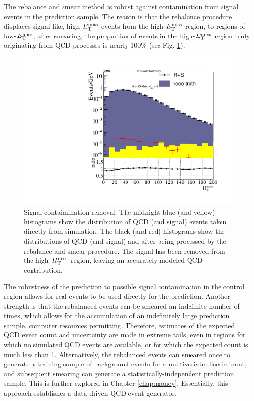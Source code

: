 The rebalance and smear method is robust against contamination from signal events in the prediction sample. The reason is that the rebalance procedure displaces signal-like, high-$E_{\text{T}}^{\rm miss}$ events from the high-$E_{\text{T}}^{\rm miss}$ region, to regions of low-$E_{\text{T}}^{\rm miss}$; after smearing, the proportion of events in the high-$E_{\text{T}}^{\rm miss}$ region truly originating from QCD processes is nearly 100\% (see Fig. \ref{fig:RplusSContamination}). 
\begin{figure}[h]
\centering
\includegraphics[width=0.6\linewidth]{figures/SusySearches/Ra2b2016/RplusSContam.pdf}
\caption{Signal contaimination removal. The midnight blue (and yellow) histograms show the distribution of QCD (and signal) events taken directly from simulation. The black (and red) histograms show the distributions of QCD (and signal) and after being processed by the rebalance and smear procedure. The signal has been removed from the high-$H_{\text{T}}^{\rm miss}$ region, leaving an accurately modeled QCD contribution.}
\label{fig:RplusSContamination}
\end{figure}
The robustness of the prediction to possible signal contamination in the control region allows for real events to be used directly for the prediction. Another strength is that the rebalanced events can be smeared an indefinite number of times, which allows for the accumulation of an indefinitely large prediction sample, computer resources permitting. Therefore, estimates of the expected QCD event count and uncertainty are made in extreme tails, even in regions for which no simulated QCD events are available, or for which the expected count is much less than 1. Alternatively, the rebalanced events can smeared once to generate a training sample of background events for a multivariate discriminant, and subsequent smearing can generate a statistically-independent prediction sample. This is further explored in Chapter \ref{chap:money}. Essentially, this approach establishes a data-driven QCD event generator.

